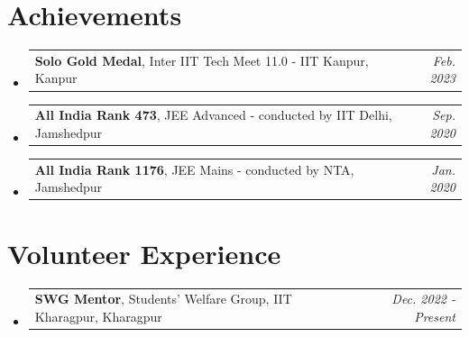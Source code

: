 \documentclass[a4paper,11pt]{article}
\makeatletter
\newcommand{\resumePOR}[3]{
\vspace{0.5mm}\item
    \begin{tabular*}{0.97\textwidth}[t]{l@{\extracolsep{\fill}}r}
        \textbf{#1},\hspace{0.3mm}#2 & \textit{\small{#3}} 
    \end{tabular*}
    \vspace{-2mm}
}
\newcommand{\resumeSubHeadingListStart}{\begin{itemize}[leftmargin=*,labelsep=0mm]}
\newcommand{\resumeSubHeadingListEnd}{\end{itemize}\vspace{2mm}}
\makeatother
\begin{document}
\section{Achievements}
\vspace{-0.4mm}
\resumeSubHeadingListStart
\resumePOR{Solo Gold Medal} %
{ Inter IIT Tech Meet 11.0 - IIT Kanpur, Kanpur} %
{Feb. 2023} %
\resumePOR{All India Rank 473}
{ JEE Advanced - conducted by IIT Delhi, Jamshedpur}
{Sep. 2020}
\resumePOR{All India Rank 1176}
{ JEE Mains - conducted by NTA, Jamshedpur}
{Jan. 2020}
\resumeSubHeadingListEnd


\section{Volunteer Experience}
\vspace{-0.4mm}
\resumeSubHeadingListStart
\resumePOR{SWG Mentor}
{ Students' Welfare Group, IIT Kharagpur, Kharagpur}
{Dec. 2022 - Present}
\resumeSubHeadingListEnd




\end{document}
